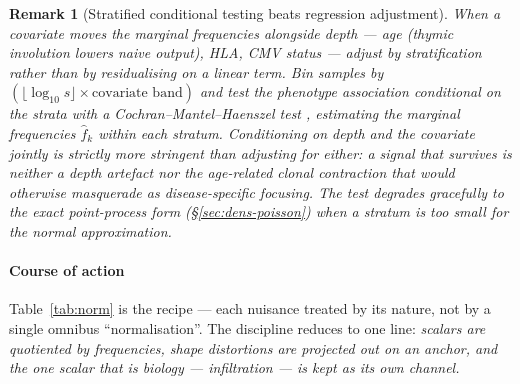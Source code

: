 \documentclass[11pt]{article}
\theoremstyle{oldplain}
\theoremstyle{oldrem}
\newtheorem{remark}{Remark}
\begin{document}
\begin{remark}[Stratified conditional testing beats regression adjustment]\label{rem:cmh}
When a covariate moves the marginal frequencies alongside depth --- age (thymic involution lowers naive output),
{\scshape HLA}, {\scshape CMV} status --- adjust by \emph{stratification} rather than by residualising on a
linear term. Bin samples by $(\lfloor\log_{10}s\rfloor \times \text{covariate band})$ and test the phenotype
association conditional on the strata with a Cochran--Mantel--Haenszel test \cite{MantelHaenszel1959}, estimating
the marginal frequencies $\hat f_k$ \emph{within} each stratum. Conditioning on depth \emph{and} the covariate
jointly is strictly more stringent than adjusting for either: a signal that survives is neither a depth artefact
nor the age-related clonal contraction that would otherwise masquerade as disease-specific focusing. The test
degrades gracefully to the exact point-process form (\S\ref{sec:dens-poisson}) when a stratum is too small for
the normal approximation.
\end{remark}

\paragraph{Course of action} Table~\ref{tab:norm} is the recipe --- each nuisance treated by its nature, not by
a single omnibus ``normalisation''. The discipline reduces to one line: \emph{scalars are quotiented by
frequencies, shape distortions are projected out on an anchor, and the one scalar that is biology ---
infiltration --- is kept as its own channel.}
\end{document}
